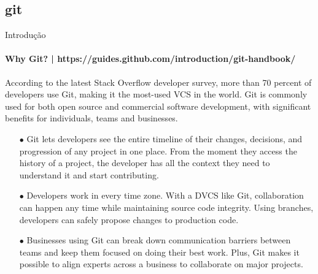 \documentclass[xcolor=dvipsnames,t]{beamer}
\begin{document}
\subsection{git}

\begin{frame}{Introdução}
\framesubtitle{Why Git? | https://guides.github.com/introduction/git-handbook/}
\small
According to the latest Stack Overflow developer survey, more than 70 percent of developers use Git, making it the most-used VCS in the world. Git is commonly used for both open source and commercial software development, with significant benefits for individuals, teams and businesses.

\begin{itemize}
	\item[$ \bullet $] Git lets developers see the entire timeline of their changes, decisions, and progression of any project in one place. From the moment they access the history of a project, the developer has all the context they need to understand it and start contributing.
	\item[$ \bullet $] Developers work in every time zone. With a DVCS like Git, collaboration can happen any time while maintaining source code integrity. Using branches, developers can safely propose changes to production code.
	\item[$ \bullet $] Businesses using Git can break down communication barriers between teams and keep them focused on doing their best work. Plus, Git makes it possible to align experts across a business to collaborate on major projects.
\end{itemize}

\end{frame}
\end{document}
